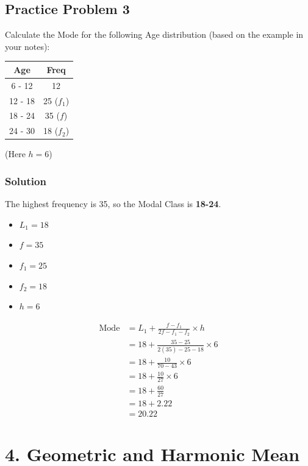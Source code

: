 \documentclass[12pt, a4paper]{article}
\begin{document}
\hrulefill

\subsection*{Practice Problem 3}
Calculate the Mode for the following Age distribution (based on the example in your notes):
\begin{center}
\begin{tabular}{|c|c|}
\hline
\textbf{Age} & \textbf{Freq} \\ \hline
6 - 12 & 12 \\ \hline
12 - 18 & 25 ($f_1$) \\ \hline
18 - 24 & 35 ($f$) \\ \hline
24 - 30 & 18 ($f_2$) \\ \hline
\end{tabular}
\end{center}
(Here $h = 6$)

\subsubsection*{Solution}
The highest frequency is 35, so the Modal Class is \textbf{18-24}.
\begin{itemize}
    \item $L_1 = 18$
    \item $f = 35$
    \item $f_1 = 25$
    \item $f_2 = 18$
    \item $h = 6$
\end{itemize}

\begin{align*}
\text{Mode} &= L_1 + \frac{f - f_1}{2f - f_1 - f_2} \times h \\
            &= 18 + \frac{35 - 25}{2(35) - 25 - 18} \times 6 \\
            &= 18 + \frac{10}{70 - 43} \times 6 \\
            &= 18 + \frac{10}{27} \times 6 \\
            &= 18 + \frac{60}{27} \\
            &= 18 + 2.22 \\
            &= 20.22
\end{align*}

\newpage

\section*{4. Geometric and Harmonic Mean}
\end{document}
